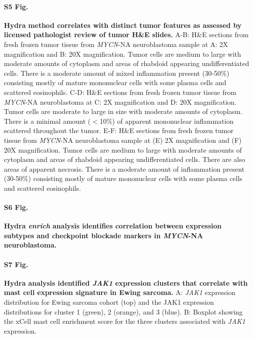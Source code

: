 \documentclass[10pt,letterpaper]{article}
\begin{document}
\paragraph*{S5 Fig.}
\label{S5_Fig} {\bf Hydra method correlates with distinct tumor features as assessed by licensed pathologist review of tumor H\&E slides.}
A-B: H\&E sections from fresh frozen tumor tissue from \textit{MYCN}-NA neuroblastoma sample at A: 2X magnification and B: 20X magnification. Tumor cells are medium to large with moderate amounts of cytoplasm and areas of rhabdoid appearing undifferentiated cells.  There is a moderate amount of mixed inflammation present (30-50\%) consisting mostly of mature mononuclear cells with some plasma cells and scattered eosinophils. C-D: H\&E sections from fresh frozen tumor tissue from \textit{MYCN}-NA neuroblastoma at C: 2X magnification and D: 20X magnification. Tumor cells are moderate to large in size with moderate amounts of cytoplasm. There is a minimal amount ($<$10\%) of apparent mononuclear inflammation scattered throughout the tumor. E-F: H\&E sections from fresh frozen tumor tissue from \textit{MYCN}-NA neuroblastoma sample at (E) 2X magnification and (F) 20X magnification.  Tumor cells are medium to large with moderate amounts of cytoplasm and areas of rhabdoid appearing undifferentiated cells.  There are also areas of apparent necrosis.  There is a moderate amount of inflammation present (30-50\%) consisting mostly of mature mononuclear cells with some plasma cells and scattered eosinophils.

\paragraph*{S6 Fig.}
\label{S6_Fig} {\bf Hydra \textit{enrich} analysis identifies correlation between expression subtypes and checkpoint blockade markers in \textit{MYCN}-NA neuroblastoma.}

\paragraph*{S7 Fig.}
\label{S7_Fig} {\bf Hydra analysis identified \textit{JAK1} expression clusters that correlate with mast cell expression signature in Ewing sarcoma.} A: \textit{JAK1} expression distribution for Ewing sarcoma cohort (top) and the JAK1 expression distributions for cluster 1 (green), 2 (orange), and 3 (blue). B: Boxplot showing the xCell mast cell enrichment score for the three clusters associated with \textit{JAK1} expression.
\end{document}
